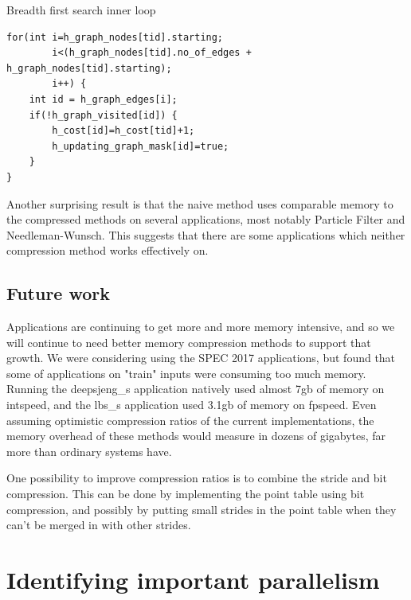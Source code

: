 \documentclass[12pt,twoside]{reedthesis}
\newenvironment{codeexample}[1][htb]
{\floatname{algorithm}{Code Example}%
	\begin{algorithm}[#1]%
	}{\end{algorithm}}
\begin{document}
		
\begin{codeexample}
	\caption{Breadth first search inner loop}
	\label{code:bfs}
		\begin{verbatim}
for(int i=h_graph_nodes[tid].starting; 
        i<(h_graph_nodes[tid].no_of_edges + h_graph_nodes[tid].starting); 
        i++) {
    int id = h_graph_edges[i];
    if(!h_graph_visited[id]) {
        h_cost[id]=h_cost[tid]+1;
        h_updating_graph_mask[id]=true;
    }
}
		\end{verbatim}
	\end{codeexample}
		
		Another surprising result is that the naive method uses comparable memory to the compressed methods on several applications, most notably Particle Filter and Needleman-Wunsch. This suggests that there are some applications which neither compression method works effectively on. 
		
		
		
		\subsection{Future work}
		
		Applications are continuing to get more and more memory intensive, and so we will continue to need better memory compression methods to support that growth. We were considering using the SPEC 2017 applications, but found that some of applications on "train" inputs were consuming too much memory. Running the deepsjeng\_s application natively used almost 7gb of memory on intspeed, and the lbs\_s application used 3.1gb of memory on fpspeed. Even assuming optimistic compression ratios of the current implementations, the memory overhead of these methods would measure in dozens of gigabytes, far more than ordinary systems have. 

		
		One possibility to improve compression ratios is to combine the stride and bit compression. This can be done by implementing the point table using bit compression, and possibly by putting small strides in the point table when they can't be merged in with other strides. 
		
	
	\section{Identifying important parallelism}\label{s:important-paralleism}
		
\end{document}
